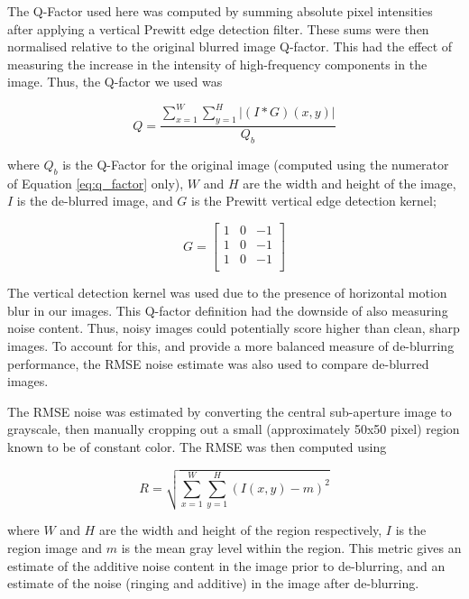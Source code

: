 The Q-Factor used here was computed by summing absolute pixel intensities after applying a vertical Prewitt edge detection filter.
These sums were then normalised relative to the original blurred image Q-factor.
This had the effect of measuring the increase in the intensity of high-frequency components in the image.
Thus, the Q-factor we used was

\begin{equation}
Q = \frac{\sum_{x=1}^{W} \sum_{y=1}^{H} \left| (I \ast G)(x, y) \right|}
{Q_b}
\label{eq:q_factor}
\end{equation}

\noindent
where $Q_b$ is the Q-Factor for the original image (computed using the numerator of Equation \ref{eq:q_factor} only), $W$ and $H$ are the width and height of the image, $I$ is the de-blurred image, and $G$ is the Prewitt vertical edge detection kernel;

\begin{equation}
G = 
\begin{bmatrix}
1 & 0 & -1 \\
1 & 0 & -1 \\
1 & 0 & -1 \\
\end{bmatrix}
\label{eq:prewitt_filter}
\end{equation}

The vertical detection kernel was used due to the presence of horizontal motion blur in our images.
This Q-factor definition had the downside of also measuring noise content.
Thus, noisy images could potentially score higher than clean, sharp images.
To account for this, and provide a more balanced measure of de-blurring performance, the RMSE noise estimate was also used to compare de-blurred images.

The RMSE noise was estimated by converting the central sub-aperture image to grayscale, then manually cropping out a small (approximately 50x50 pixel) region known to be of constant color.
The RMSE was then computed using

\begin{equation}
R = \sqrt{ \sum_{x=1}^{W} \sum_{y=1}^{H} (I(x,y) - m)^2 }
\end{equation}

\noindent
where $W$ and $H$ are the width and height of the region respectively, $I$ is the region image and $m$ is the mean gray level within the region.
This metric gives an estimate of the additive noise content in the image prior to de-blurring, and an estimate of the noise (ringing and additive) in the image after de-blurring.

